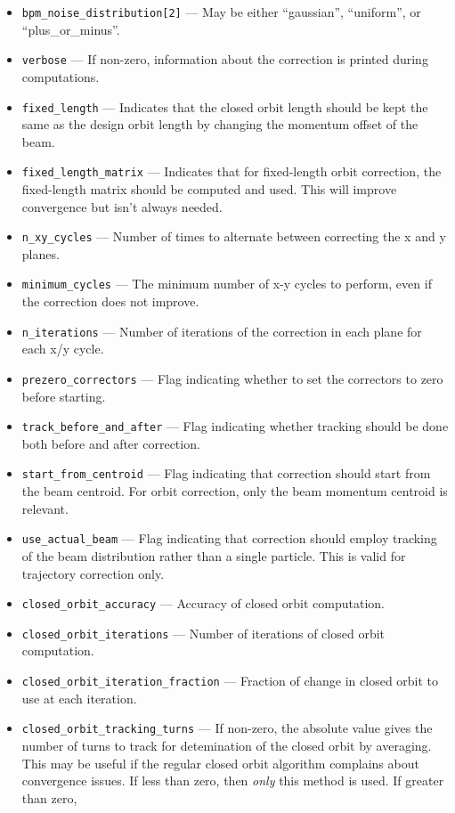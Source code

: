 \documentclass[11pt]{article}
\begin{document}
\begin{itemize}
\item \verb|bpm_noise_distribution[2]| --- May be either ``gaussian'', ``uniform'', or ``plus\_or\_minus''.
\item \verb|verbose| --- If non-zero, information about the correction is printed during computations.
\item \verb|fixed_length| --- Indicates that the closed orbit length should be kept the same as the design orbit
length by changing the momentum offset of the beam.
\item \verb|fixed_length_matrix| --- Indicates that for fixed-length orbit correction, the fixed-length
matrix should be computed and used.  This will improve convergence but isn't always needed.
\item \verb|n_xy_cycles| --- Number of times to alternate between correcting the x and y planes.
\item \verb|minimum_cycles| --- The minimum number of x-y cycles to perform, even if the correction does not improve.
\item \verb|n_iterations| --- Number of iterations of the correction in each plane for each x/y cycle.
\item \verb|prezero_correctors| --- Flag indicating whether to set the correctors to zero before starting.
\item \verb|track_before_and_after| --- Flag indicating whether tracking should be done both before and after
correction.
\item \verb|start_from_centroid| --- Flag indicating that correction
should start from the beam centroid.  For orbit correction, only the
beam momentum centroid is relevant.
\item \verb|use_actual_beam| --- Flag indicating that correction
should employ tracking of the beam distribution rather than a single
particle.  This is valid for trajectory correction only.
\item \verb|closed_orbit_accuracy| --- Accuracy of closed orbit computation.
\item \verb|closed_orbit_iterations| --- Number of iterations of closed orbit computation.
\item \verb|closed_orbit_iteration_fraction| --- Fraction of change in closed orbit to
use at each iteration.
\item \verb|closed_orbit_tracking_turns| --- If non-zero, the absolute value gives the number of turns to track for detemination 
  of the closed orbit by averaging. This may be useful if the regular closed orbit algorithm
  complains about convergence issues. If less than zero, then {\em only} this method is used. If greater than zero, 

\end{itemize}
\end{document}
